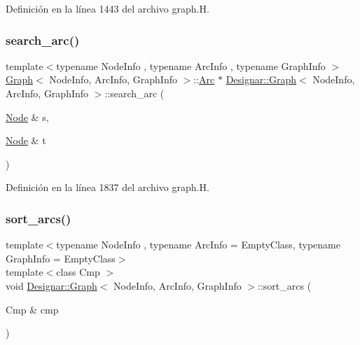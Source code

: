 Definición en la línea 1443 del archivo graph.\+H.

\mbox{\label{class_designar_1_1_graph_afa69dd3cc6bacfed22864f5ad7c189ba}} 
\subsubsection{\texorpdfstring{search\+\_\+arc()}{search\_arc()}}
{\footnotesize\ttfamily template$<$typename Node\+Info , typename Arc\+Info , typename Graph\+Info $>$ \\
\hyperlink{class_designar_1_1_graph}{Graph}$<$ Node\+Info, Arc\+Info, Graph\+Info $>$\+::\hyperlink{class_designar_1_1_graph_a74c730ef4ce2d20f998d72bd25c2b5bf}{Arc} $\ast$ \hyperlink{class_designar_1_1_graph}{Designar\+::\+Graph}$<$ Node\+Info, Arc\+Info, Graph\+Info $>$\+::search\+\_\+arc (\begin{DoxyParamCaption}\item[{\hyperlink{class_designar_1_1_graph_a5dfc7dba9d092ac489c72e40390c37d0}{Node} \&}]{s,  }\item[{\hyperlink{class_designar_1_1_graph_a5dfc7dba9d092ac489c72e40390c37d0}{Node} \&}]{t }\end{DoxyParamCaption})}



Definición en la línea 1837 del archivo graph.\+H.

\mbox{\label{class_designar_1_1_graph_a39af536f6e08248e0d343dcd300713c2}} 
\subsubsection{\texorpdfstring{sort\+\_\+arcs()}{sort\_arcs()}\hspace{0.1cm}{\footnotesize\ttfamily [1/2]}}
{\footnotesize\ttfamily template$<$typename Node\+Info , typename Arc\+Info  = Empty\+Class, typename Graph\+Info  = Empty\+Class$>$ \\
template$<$class Cmp $>$ \\
void \hyperlink{class_designar_1_1_graph}{Designar\+::\+Graph}$<$ Node\+Info, Arc\+Info, Graph\+Info $>$\+::sort\+\_\+arcs (\begin{DoxyParamCaption}\item[{Cmp \&}]{cmp }\end{DoxyParamCaption})\hspace{0.3cm}{\ttfamily [inline]}}



